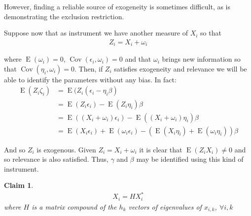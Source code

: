 \documentclass[10pt]{article}
\makeatletter
\newtheorem{claim}{Claim}
\def\b{\beta}
\renewenvironment{proof}[1][\proofname] {\par\pushQED{\qed}\normalfont\topsep6\p@\@plus6\p@\relax\trivlist\item[\hskip\labelsep\bfseries#1\@addpunct{.}]\ignorespaces}{\popQED\endtrivlist\@endpefalse}
\makeatother
\begin{document}
\begin{proof}
                However, finding a reliable source of exogeneity is sometimes difficult, as is demonstrating the exclusion restriction.
                
                Suppose now that as instrument we have another measure of $X_i$ so that
                \begin{align*}
                    Z_i=X_i+\omega_i
                \end{align*}
                
                where $\operatorname{E}(\omega_i)=0$, $\operatorname{Cov}(\epsilon_i,\omega_i)=0$ and that $\omega_i$ brings new information so that $\operatorname{Cov}(\eta_i,\omega_i)=0$. Then, if $Z_i$ satisfies exogeneity and relevance we will be able to identify the parameters without any bias. In fact:
                \begin{align*}
                    \operatorname{E}(Z_i\zeta_i)&=\operatorname{E}(Z_i(\epsilon_i-\eta_i\b)\\
                    &=\operatorname{E}(Z_i\epsilon_i)-\operatorname{E}(Z_i\eta_i)\b\\
                &= \operatorname{E}((X_i+\omega_i)\epsilon_i)-\operatorname{E}((X_i+\omega_i)\eta_i)\b \\
                &=\operatorname{E}(X_i\epsilon_i) + \operatorname{E}(\omega_i\epsilon_i)-(\operatorname{E}(X_i\eta_i)+\operatorname{E}(\omega_i\eta_i))\b
                \end{align*}
                
                And so $Z_i$ is exogenous. Given $Z_i=X_i+\omega_i$ it is clear that $\operatorname{E}(Z_iX_i)\neq0$ and so relevance is also satisfied. Thus, $\gamma$ and $\b$ may be identified using this kind of instrument.

        \end{proof}

        \begin{claim}
        \begin{align*}
                    X_i=HX^*_i
                \end{align*}
        where $H$ is a matrix compound of the $h_k$ vectors of eigenvalues of $x_{i,k}$, $\forall i,k$
        \end{claim}
\end{document}
